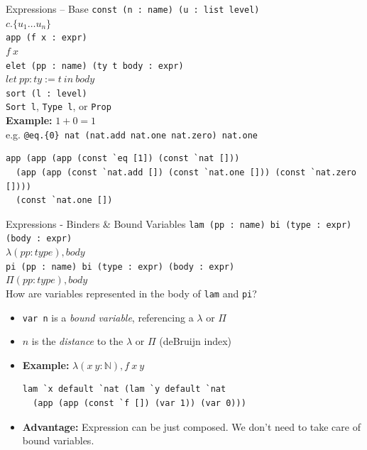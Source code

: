 \documentclass[usenames,dvipsnames]{beamer}
\begin{document}
\begin{frame}[fragile]{Expressions -- Base}
  \lstinline$const (n : name) (u : list level)$ \\
  \quad $c.\{u_1 \ldots u_n\}$ \\[2ex]
  \lstinline$app (f x : expr)$ \\
  \quad $f~x$ \\[2ex]
  \lstinline$elet (pp : name) (ty t body : expr)$ \\
  \quad $let~pp : ty := t~in~body$ \\[2ex]
  \lstinline$sort (l : level)$ \\
  \quad \lstinline$Sort l$, \lstinline$Type l$, or \lstinline$Prop$ \\[2ex]

  \textbf{Example:} $1 + 0 = 1$ \\
   e.g. \lstinline$@eq.{0} nat (nat.add nat.one nat.zero) nat.one$
\begin{lstlisting}
app (app (app (const `eq [1]) (const `nat []))
  (app (app (const `nat.add []) (const `nat.one [])) (const `nat.zero [])))
  (const `nat.one [])
\end{lstlisting}
\end{frame}

\begin{frame}[fragile]{Expressions - Binders \& Bound Variables}
  \lstinline$lam (pp : name) bi (type : expr) (body : expr)$ \\
  \quad $\lambda (pp : type), body$ \\[2ex]
  \lstinline$pi (pp : name) bi (type : expr) (body : expr)$ \\
  \quad $\Pi (pp : type), body$ \\[2ex]

  How are variables represented in the body of \texttt{lam} and \texttt{pi}?
  \begin{itemize}
    \item \lstinline{var n} is a \emph{bound variable}, referencing a $\lambda$ or $\Pi$
    \item $n$ is the \emph{distance} to the $\lambda$ or $\Pi$ (deBruijn index)
    \item \textbf{Example:} $\lambda (x~y : \mathbb{N}), f~x~y$
\begin{lstlisting}
lam `x default `nat (lam `y default `nat
  (app (app (const `f []) (var 1)) (var 0)))
\end{lstlisting}
    \item \textbf{Advantage:} Expression can be just composed. We don't need to take care of bound variables.
  \end{itemize}
\end{frame}
\end{document}

